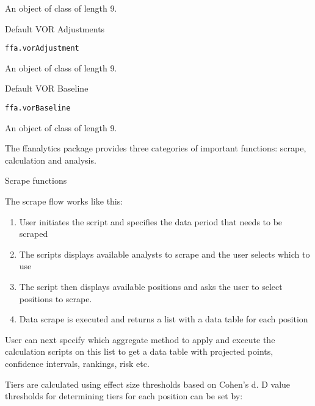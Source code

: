 \documentclass[a4paper]{book}
\begin{document}
%
\begin{Format}
An object of class  of length 9.
\end{Format}
%
\begin{Description}\relax
Default VOR Adjustments
\end{Description}
%
\begin{Usage}
\begin{verbatim}
ffa.vorAdjustment
\end{verbatim}
\end{Usage}
%
\begin{Format}
An object of class  of length 9.
\end{Format}
%
\begin{Description}\relax
Default VOR Baseline
\end{Description}
%
\begin{Usage}
\begin{verbatim}
ffa.vorBaseline
\end{verbatim}
\end{Usage}
%
\begin{Format}
An object of class  of length 9.
\end{Format}
%
\begin{Description}\relax
The ffanalytics package provides three categories of important functions:
scrape, calculation and analysis.
\end{Description}
%
\begin{Section}{Scrape functions}

The scrape flow works like this:
\begin{enumerate}

\item{} User initiates the script and specifies the data period that needs to
be scraped
\item{} The scripts displays available analysts to scrape and the user selects
which to use
\item{} The script then displays available positions and asks the user to
select positions to scrape.
\item{}  Data scrape is executed and returns a list with a data table for each
position
\end{enumerate}

User can next specify which aggregate method to apply and execute the
calculation scripts on this list to get a data table with projected points,
confidence intervals, rankings, risk etc.

Tiers are calculated using effect size thresholds based on Cohen's d.
D value thresholds for determining tiers for each position can be set by:
\end{Section}
\end{document}
